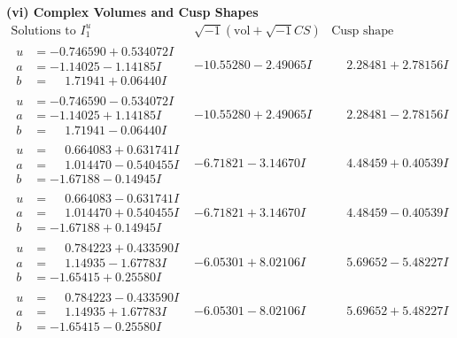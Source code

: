 \documentclass[1p]{elsarticle_modified}
\theoremstyle{definition}
\newcommand{\I}{\sqrt{-1}}
\begin{document}
\newpage\flushleft \textbf{(vi) Complex Volumes and Cusp Shapes}
$$\begin{array}{c|c|c}  
\text{Solutions to }I^u_{1}& \I (\text{vol} + \sqrt{-1}CS) & \text{Cusp shape}\\
 \hline 
\begin{aligned}
u &= -0.746590 + 0.534072 I \\
a &= -1.14025 - 1.14185 I \\
b &= \phantom{-}1.71941 + 0.06440 I\end{aligned}
 & -10.55280 - 2.49065 I & \phantom{-}2.28481 + 2.78156 I \\ \hline\begin{aligned}
u &= -0.746590 - 0.534072 I \\
a &= -1.14025 + 1.14185 I \\
b &= \phantom{-}1.71941 - 0.06440 I\end{aligned}
 & -10.55280 + 2.49065 I & \phantom{-}2.28481 - 2.78156 I \\ \hline\begin{aligned}
u &= \phantom{-}0.664083 + 0.631741 I \\
a &= \phantom{-}1.014470 - 0.540455 I \\
b &= -1.67188 - 0.14945 I\end{aligned}
 & -6.71821 - 3.14670 I & \phantom{-}4.48459 + 0.40539 I \\ \hline\begin{aligned}
u &= \phantom{-}0.664083 - 0.631741 I \\
a &= \phantom{-}1.014470 + 0.540455 I \\
b &= -1.67188 + 0.14945 I\end{aligned}
 & -6.71821 + 3.14670 I & \phantom{-}4.48459 - 0.40539 I \\ \hline\begin{aligned}
u &= \phantom{-}0.784223 + 0.433590 I \\
a &= \phantom{-}1.14935 - 1.67783 I \\
b &= -1.65415 + 0.25580 I\end{aligned}
 & -6.05301 + 8.02106 I & \phantom{-}5.69652 - 5.48227 I \\ \hline\begin{aligned}
u &= \phantom{-}0.784223 - 0.433590 I \\
a &= \phantom{-}1.14935 + 1.67783 I \\
b &= -1.65415 - 0.25580 I\end{aligned}
 & -6.05301 - 8.02106 I & \phantom{-}5.69652 + 5.48227 I \\ \hline\begin{aligned}

\end{aligned}
\end{array}$$
\end{document}

